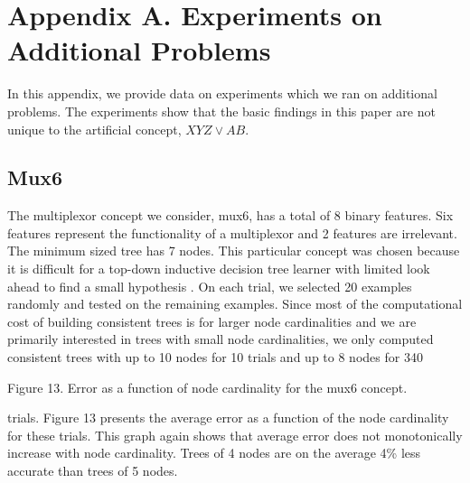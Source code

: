 
\appendix
\section*{Appendix A. Experiments on Additional Problems}
In this appendix, we provide data on experiments which we ran on
additional problems. The experiments show that the basic findings
in this paper are not unique to the artificial concept, $XYZ \vee AB$.  

\subsection*{Mux6}

The multiplexor concept we consider, mux6, has a total of 8 binary
features.  Six features represent the functionality of a multiplexor
and 2 features are irrelevant.  The minimum sized tree has 7 nodes.  
This particular concept was chosen because it is difficult for a top-down 
inductive decision tree learner with limited look ahead to find 
a small hypothesis \cite{quinlan93}.  On each trial, we selected 20
examples randomly and tested on the remaining examples.  Since most of
the computational cost of building consistent trees is for larger node
cardinalities and we are primarily interested in trees with small
node cardinalities, we only computed consistent trees with up to 10
nodes for 10 trials and up to 8 nodes for 340

\vspace*{0.3cm}
\hspace{0.6cm}
\centerline{}

\vspace{0.2cm}
\parindent 0.0cm
\begin{center}
Figure 13. Error as a function of node cardinality for the mux6 concept.\\
\end{center}
\parindent 0.6cm
\parskip 0.0cm

\noindent
trials.  Figure 13 presents the average error as a function of the node 
cardinality for these trials.  This graph again shows that average error 
does not monotonically increase with node cardinality.  Trees of 4 nodes 
are on the average 4\% less accurate than trees of 5 nodes.

